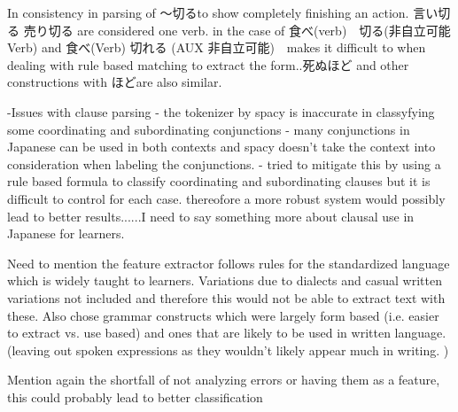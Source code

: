 In consistency in parsing of 〜切るto show completely finishing an action. 言い切る 売り切る are considered one verb. in the
case of 食べ(verb)　切る(非自立可能Verb) and 食べ(Verb) 切れる (AUX 非自立可能)　makes it difficult to when dealing with rule based
matching to extract the form..死ぬほど and other constructions with ほどare also similar.

-Issues with clause parsing - the tokenizer by spacy is inaccurate in classyfying some coordinating and
subordinating conjunctions - many conjunctions in Japanese can be used in both contexts and spacy doesn't take the
context into consideration when labeling the conjunctions. - tried to mitigate this by using a rule based formula to
classify coordinating and subordinating clauses but it is difficult to control for each case. thereofore a more
robust system would possibly lead to better results......I need to say something more about clausal use in Japanese
for learners.


Need to mention the feature extractor follows rules for the standardized language which is widely taught to
learners. Variations due to dialects and casual written variations not included and therefore this would not be
able to extract text with these. Also chose grammar constructs which were largely form based (i.e. easier to extract
vs. use based) and ones that are likely to be used in written language. (leaving out spoken expressions as they
wouldn't likely appear much in writing. )

Mention again the shortfall of not analyzing errors or having them as a feature, this could probably lead to better
classification